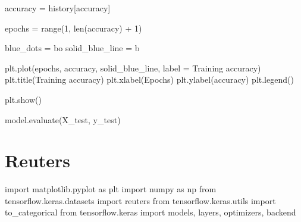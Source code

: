 \documentclass[
  letterpaper,
  DIV=11,
  numbers=noendperiod]{scrreprt}
\newenvironment{Shaded}{\begin{snugshade}}{\end{snugshade}}
\newcommand{\BuiltInTok}[1]{\textcolor[rgb]{0.00,0.23,0.31}{#1}}
\newcommand{\DecValTok}[1]{\textcolor[rgb]{0.68,0.00,0.00}{#1}}
\newcommand{\ImportTok}[1]{\textcolor[rgb]{0.00,0.46,0.62}{#1}}
\newcommand{\NormalTok}[1]{\textcolor[rgb]{0.00,0.23,0.31}{#1}}
\newcommand{\OperatorTok}[1]{\textcolor[rgb]{0.37,0.37,0.37}{#1}}
\newcommand{\StringTok}[1]{\textcolor[rgb]{0.13,0.47,0.30}{#1}}
\begin{document}
\begin{Shaded}
\begin{Highlighting}[]
\NormalTok{accuracy }\OperatorTok{=}\NormalTok{ history[}\StringTok{\textquotesingle{}accuracy\textquotesingle{}}\NormalTok{]}

\NormalTok{epochs }\OperatorTok{=} \BuiltInTok{range}\NormalTok{(}\DecValTok{1}\NormalTok{, }\BuiltInTok{len}\NormalTok{(accuracy) }\OperatorTok{+} \DecValTok{1}\NormalTok{)}

\NormalTok{blue\_dots }\OperatorTok{=} \StringTok{\textquotesingle{}bo\textquotesingle{}}
\NormalTok{solid\_blue\_line }\OperatorTok{=} \StringTok{\textquotesingle{}b\textquotesingle{}}

\NormalTok{plt.plot(epochs, accuracy, solid\_blue\_line, label }\OperatorTok{=} \StringTok{\textquotesingle{}Training accuracy\textquotesingle{}}\NormalTok{)}
\NormalTok{plt.title(}\StringTok{\textquotesingle{}Training accuracy\textquotesingle{}}\NormalTok{)}
\NormalTok{plt.xlabel(}\StringTok{\textquotesingle{}Epochs\textquotesingle{}}\NormalTok{)}
\NormalTok{plt.ylabel(}\StringTok{\textquotesingle{}accuracy\textquotesingle{}}\NormalTok{)}
\NormalTok{plt.legend()}

\NormalTok{plt.show()}
\end{Highlighting}
\end{Shaded}

\begin{Shaded}
\begin{Highlighting}[]
\NormalTok{model.evaluate(X\_test, y\_test)}
\end{Highlighting}
\end{Shaded}

\hypertarget{reuters}{%
\chapter{Reuters}\label{reuters}}

\begin{Shaded}
\begin{Highlighting}[]
\ImportTok{import}\NormalTok{ matplotlib.pyplot }\ImportTok{as}\NormalTok{ plt}
\ImportTok{import}\NormalTok{ numpy }\ImportTok{as}\NormalTok{ np}
\ImportTok{from}\NormalTok{ tensorflow.keras.datasets }\ImportTok{import}\NormalTok{ reuters}
\ImportTok{from}\NormalTok{ tensorflow.keras.utils }\ImportTok{import}\NormalTok{ to\_categorical}
\ImportTok{from}\NormalTok{ tensorflow.keras }\ImportTok{import}\NormalTok{ models, layers, optimizers, backend}
\end{Highlighting}
\end{Shaded}
\end{document}
